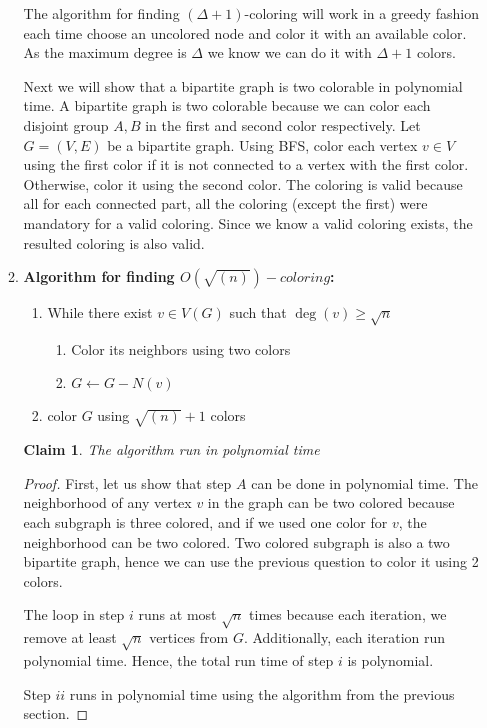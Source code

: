 \documentclass{article}
\newtheorem{claim}[section]{Claim}
\begin{document}
\begin{enumerate}
\begin{enumerate}
The algorithm for finding $(\Delta+1)$-coloring will work in a greedy fashion each time choose an uncolored node and color it with an available color. As the maximum degree is $\Delta$ we know we can do it with $\Delta +1$ colors.

Next we will show that a bipartite graph is two colorable in polynomial time. A bipartite graph is two colorable because we can color each disjoint group $A, B$ in the first and second color respectively. 
Let $G = (V, E)$ be a bipartite graph. Using BFS, color each vertex $v \in V$ using the first color if it is not connected to a vertex with the first color.
Otherwise, color it using the second color.
The coloring is valid because all for each connected part, all the coloring (except the first) were mandatory for a valid coloring. Since we know a valid coloring exists, the resulted coloring is also valid.

	\item \textbf{Algorithm for finding $O(\sqrt{(n)})-coloring$:}
	\begin{enumerate}
		\item While there exist $v \in V(G)$ such that $\deg(v) \geq \sqrt{n}$
		\begin{enumerate}
			\item Color its neighbors using two colors
			\item $G \leftarrow G - N(v)$
		\end{enumerate}
		\item color $G$ using $\sqrt{(n)} + 1$ colors
	\end{enumerate}
	

	\begin{claim}
		The algorithm run in polynomial time
\end{claim}
\begin{proof}
	First, let us show that step $A$ can be done in polynomial time. The neighborhood of any vertex $v$ in the graph can be two colored because each subgraph is three colored, and if we used one color for $v$, the neighborhood can be two colored. Two colored subgraph is also a two bipartite graph, hence we can use the previous question to color it using 2 colors.
	
	The loop in step $i$ runs at most $\sqrt{n}$ times because each iteration, we remove at least $\sqrt{n}$ vertices from $G$. Additionally, each iteration run polynomial time. Hence, the total run time of step $i$ is polynomial.
	
	Step $ii$ runs in polynomial time using the algorithm from the previous section.
\end{proof}


\end{enumerate}
\end{enumerate}
\end{document}
